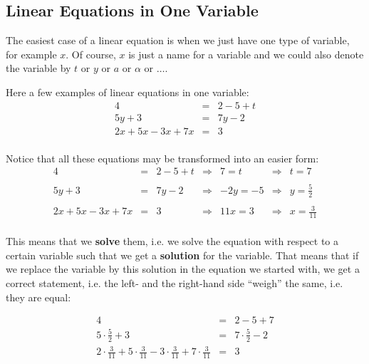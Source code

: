 \vspace{3cm}

\newpage

\subsection{Linear Equations in One Variable}

The easiest case of a linear equation is when we just have one type of variable, for example $x$. Of course, $x$ is just a name for a variable and we could also denote the variable by $t$ or $y$ or $a$ or $\alpha$ or $\ldots$.  
\vsp

Here a few examples of linear equations in one variable:
\begin{eqnarray*}
4&=&2-5+t \\
5y+3&=&7y-2 \\
2x+5x-3x+7x&=&3 \\
\end{eqnarray*}


Notice that all these equations may be transformed into an easier form:
\[
\begin{array}{rclcccc}
4&=&2-5+t &\Rightarrow&7=t &\Rightarrow& t=7\\
&&&&&&\\
5y+3&=&7y-2 &\Rightarrow& -2y=-5 &\Rightarrow& y=\frac{5}{2} \\
&&&&&&\\
2x+5x-3x+7x&=&3 &\Rightarrow& 11x=3 &\Rightarrow& x=\frac{3}{11}  \\
\end{array}
\]

This means that we \textbf{solve} them, i.e. we solve the equation with respect to a certain variable such that we get a \textbf{solution} for the variable. That means that if we replace the variable by this solution in the equation we started with, we get a correct statement, i.e. the left- and the right-hand side ``weigh'' the same, i.e. they are equal:

\[
\begin{array}{rcl}
4&=&2-5+7 \\
5\cdot \frac{5}{2}+3&=&7\cdot \frac{5}{2}-2 \\
2\cdot \frac{3}{11}+5\cdot \frac{3}{11}-3\cdot \frac{3}{11}+7\cdot \frac{3}{11}&=&3\\
\end{array}
\]
\vsp

